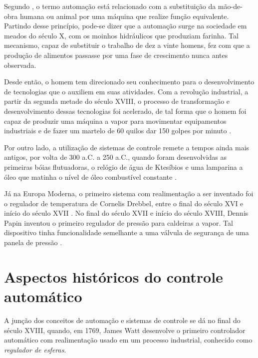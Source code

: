 \label{cap:introducao}

Segundo , o termo automação está relacionado com a
substituição da mão-de-obra humana ou animal por uma máquina que realize função
equivalente. Partindo desse princípio, pode-se dizer que a automação surge na
sociedade em meados do século X, com os moinhos hidráulicos que produziam
farinha. Tal mecanismo, capaz de substituir o trabalho de dez a vinte homens,
fez com que a produção de alimentos passasse por uma fase de crescimento nunca
antes observada.

Desde então, o homem tem direcionado seu conhecimento para o desenvolvimento de
tecnologias que o auxiliem em suas atividades. Com a revolução industrial, a
partir da segunda metade do século XVIII, o processo de transformação e
desenvolvimento dessas tecnologias foi acelerado, de tal forma que o homem foi
capaz de produzir uma máquina a vapor para movimentar equipamentos industriais e
de fazer um martelo de 60 quilos dar 150 golpes por minuto \cite{goeking:2010}.

Por outro lado, a utilização de sistemas de controle remete a tempos ainda mais
antigos, por volta de 300 a.C. a 250 a.C., quando foram desenvolvidas as
primeiras bóias flutuadoras, o relógio de água de Ktesíbios e uma lamparina a
óleo que matinha o nível de óleo combustível constante
\cite{mayr:1970,mayr:1971,mayr:1975}.

Já na Europa Moderna, o primeiro sistema com realimentação a ser inventado foi o
regulador de temperatura de Cornelis Drebbel, entre o final do século XVI e
início do século XVII \cite{mayr:1975}. No final do século XVII e início do
século XVIII, Dennis Papin inventou o primeiro regulador de pressão para
caldeiras a vapor. Tal dispositivo tinha funcionalidade semelhante a uma válvula
de segurança de uma panela de pressão \cite{dorf:2009}. 

\section{Aspectos históricos do controle automático}
A junção dos conceitos de automação e sistemas de controle se dá no final do
século XVIII, quando, em 1769, James Watt desenvolve o primeiro controlador
automático com realimentação usado em um processo industrial, conhecido como
{\it regulador de esferas}.


